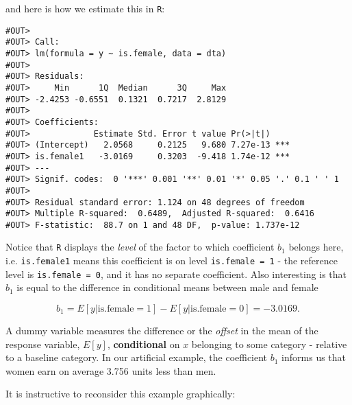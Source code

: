 \documentclass[]{book}
\newenvironment{Shaded}{\begin{snugshade}}{\end{snugshade}}
\newcommand{\KeywordTok}[1]{\textcolor[rgb]{0.13,0.29,0.53}{\textbf{#1}}}
\newcommand{\StringTok}[1]{\textcolor[rgb]{0.31,0.60,0.02}{#1}}
\newcommand{\CommentTok}[1]{\textcolor[rgb]{0.56,0.35,0.01}{\textit{#1}}}
\newcommand{\OperatorTok}[1]{\textcolor[rgb]{0.81,0.36,0.00}{\textbf{#1}}}
\newcommand{\NormalTok}[1]{#1}
\newenvironment{note}{\begin{tcolorbox}[colback=blue!5!white,colframe=blue!75!black]}{\end{tcolorbox}}
\begin{document}
and here is how we estimate this in \texttt{R}:

\begin{Shaded}
\end{Shaded}

\begin{verbatim}
#OUT> 
#OUT> Call:
#OUT> lm(formula = y ~ is.female, data = dta)
#OUT> 
#OUT> Residuals:
#OUT>     Min      1Q  Median      3Q     Max 
#OUT> -2.4253 -0.6551  0.1321  0.7217  2.8129 
#OUT> 
#OUT> Coefficients:
#OUT>             Estimate Std. Error t value Pr(>|t|)    
#OUT> (Intercept)   2.0568     0.2125   9.680 7.27e-13 ***
#OUT> is.female1   -3.0169     0.3203  -9.418 1.74e-12 ***
#OUT> ---
#OUT> Signif. codes:  0 '***' 0.001 '**' 0.01 '*' 0.05 '.' 0.1 ' ' 1
#OUT> 
#OUT> Residual standard error: 1.124 on 48 degrees of freedom
#OUT> Multiple R-squared:  0.6489,  Adjusted R-squared:  0.6416 
#OUT> F-statistic:  88.7 on 1 and 48 DF,  p-value: 1.737e-12
\end{verbatim}

Notice that \texttt{R} displays the \emph{level} of the factor to which
coefficient \(b_1\) belongs here, i.e. \texttt{is.female1} means this
coefficient is on level \texttt{is.female\ =\ 1} - the reference level
is \texttt{is.female\ =\ 0}, and it has no separate coefficient. Also
interesting is that \(b_1\) is equal to the difference in conditional
means between male and female

\[b_1 = E[y|\text{is.female}=1] - E[y|\text{is.female}=0]=-3.0169.\]

\begin{note}
A dummy variable measures the difference or the \emph{offset} in the
mean of the response variable, \(E[y]\), \textbf{conditional} on \(x\)
belonging to some category - relative to a baseline category. In our
artificial example, the coefficient \(b_1\) informs us that women earn
on average 3.756 units less than men.
\end{note}

It is instructive to reconsider this example graphically:
\end{document}
